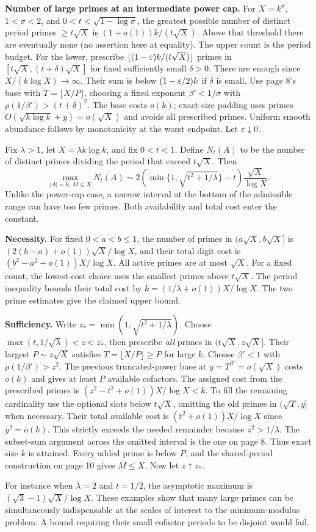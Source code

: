 \textbf{Number of large primes at an intermediate power cap.} For $X=k^\sigma$, $1<\sigma<2$, and $0<t<\sqrt{1-\log\sigma}$, the greatest possible number of distinct period primes $\ge t\sqrt X$ is $(1+o(1))k/(t\sqrt X)$. Above that threshold there are eventually none (no assertion here at equality). The upper count is the period budget. For the lower, prescribe $\lfloor(1-\varepsilon)k/(t\sqrt X)\rfloor$ primes in $[t\sqrt X,(t+\delta)\sqrt X]$ for fixed sufficiently small $\delta>0$. There are enough since $X/(k\log X)\to\infty$. Their sum is below $(1-\varepsilon/2)k$ if $\delta$ is small. Use page 8's base with $T=\lfloor X/P\rfloor$, choosing a fixed exponent $\beta'<1/\sigma$ with $\rho(1/\beta')>(t+\delta)^2$. The base costs $o(k)$; exact-size padding uses primes $O(\sqrt{k\log k}+y)=o(\sqrt X)$ and avoids all prescribed primes. Uniform smooth abundance follows by monotonicity at the worst endpoint. Let $\varepsilon\downarrow0$.

\newpage
{}
Fix $\lambda>1$, let $X=\lambda k\log k$, and fix $0<t<1$. Define $N_t(A)$ to be the number of distinct primes dividing the period that exceed $t\sqrt X$. Then
\[
 \max_{|A|=k,\,M\le X}N_t(A)
 \sim 2\left(\min\{1,\sqrt{t^2+1/\lambda}\}-t\right)
                      \frac{\sqrt X}{\log X}.
\]
Unlike the power-cap case, a narrow interval at the bottom of the admissible range can have too few primes. Both availability and total cost enter the constant.

\textbf{Necessity.} For fixed $0<a<b\le1$, the number of primes in $(a\sqrt X,b\sqrt X]$ is $(2(b-a)+o(1))\sqrt X/\log X$, and their total digit cost is $(b^2-a^2+o(1))X/\log X$. All active primes are at most $\sqrt X$. For a fixed count, the lowest-cost choice uses the smallest primes above $t\sqrt X$. The period inequality bounds their total cost by $k=(1/\lambda+o(1))X/\log X$. The two prime estimates give the claimed upper bound.

\textbf{Sufficiency.} Write $z_*=\min(1,\sqrt{t^2+1/\lambda})$. Choose $\max(t,1/\sqrt\lambda)<z<z_*$, then prescribe \emph{all} primes in $(t\sqrt X,z\sqrt X]$. Their largest $P\sim z\sqrt X$ satisfies $T=\lfloor X/P\rfloor\ge P$ for large $k$. Choose $\beta'<1$ with $\rho(1/\beta')>z^2$. The previous truncated-power base at $y=T^{\beta'}=o(\sqrt X)$ costs $o(k)$ and gives at least $P$ available cofactors. The assigned cost from the prescribed primes is $(z^2-t^2+o(1))X/\log X<k$. To fill the remaining cardinality use the optional slots below $t\sqrt X$, omitting the old primes in $(\sqrt T,y]$ when necessary. Their total available cost is $(t^2+o(1))X/\log X$ since $y^2=o(k)$. This strictly exceeds the needed remainder because $z^2>1/\lambda$. The subset-sum argument across the omitted interval is the one on page 8. Thus exact size $k$ is attained. Every added prime is below $P$, and the shared-period construction on page 10 gives $M\le X$. Now let $z\uparrow z_*$.

For instance when $\lambda=2$ and $t=1/2$, the asymptotic maximum is $(\sqrt3-1)\sqrt X/\log X$. These examples show that many large primes can be simultaneously indispensable at the scales of interest to the minimum-modulus problem. A bound requiring their small cofactor periods to be disjoint would fail.
